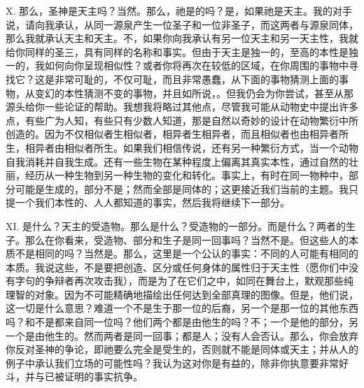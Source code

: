 X. 那么，圣神是天主吗？当然。那么，祂是的吗？是，如果祂是天主。我的对手说，请向我承认，从同一源泉产生一位圣子和一位非圣子，而这两者与源泉同体，那么我就承认天主和天主。不，如果你向我承认有另一位天主和另一天主性，我就给你同样的圣三，具有同样的名称和事实。但由于天主是独一的，至高的本性是独一的，我如何向你呈现相似性？或者你将再次在较低的区域，在你周围的事物中寻找它？这是非常可耻的，不仅可耻，而且非常愚蠢，从下面的事物猜测上面的事物，从变幻的本性猜测不变的事物，并且如所说，。但我仍会为你尝试，甚至从那源头给你一些论证的帮助。我想我将略过其他点，尽管我可能从动物史中提出许多点，有些广为人知，有些只有少数人知道，那是自然以奇妙的设计在动物繁衍中所创造的。因为不仅相似者生相似者，相异者生相异者，而且相似者也由相异者所生，相异者由相似者所生。如果我们相信传说，还有另一种繁衍方式，当一个动物自我消耗并自我生成。还有一些生物在某种程度上偏离其真实本性，通过自然的壮丽，经历从一种生物到另一种生物的变化和转化。事实上，有时在同一物种中，部分可能是生成的，部分不是；然而全部是同体的；这更接近我们当前的主题。我只提一个我们本性的、人人都知道的事实，然后我将继续下一部分。\par

XI. 是什么？天主的受造物。那么是什么？受造物的一部分。而是什么？两者的生子。那么在你看来，受造物、部分和生子是同一回事吗？当然不是。但这些人的本质不是相同的吗？当然是。那么，这里是一个公认的事实：不同的人可能有相同的本质。我说这些，不是要把创造、区分或任何身体的属性归于天主性（愿你们中没有字句的争辩者再次攻击我），而是为了在它们之中，如同在舞台上，默观那些纯理智的对象。因为不可能精确地描绘出任何达到全部真理的图像。但是，他们说，这一切是什么意思？难道一个不是生于那一位的后裔，另一个是那一位的其他东西吗？和不是都来自同一位吗？他们两个都是由他生的吗？不；一个是他的部分，另一个是由他生的。然而两者是同一回事；都是人；没有人会否认。那么，你会放弃你反对圣神的争论，即祂要么完全是受生的，否则就不能是同体或天主；并从人的例子中承认我们立场的可能性吗？我认为这对你是有益的，除非你执意要非常好斗，并与已被证明的事实抗争。\par

